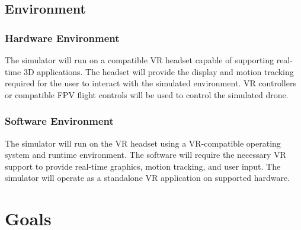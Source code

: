 \documentclass{article}
\begin{document}
\subsection{Environment}


\subsubsection{Hardware Environment}

The simulator will run on a compatible VR headset capable of supporting real-time 3D applications. The headset will provide the display and motion tracking required for the user to interact with the simulated environment. VR controllers or compatible FPV flight controls will be used to control the simulated drone.

\subsubsection{Software Environment}

The simulator will run on the VR headset using a VR-compatible operating system and runtime environment. The software will require the necessary VR support to provide real-time graphics, motion tracking, and user input. The simulator will operate as a standalone VR application on supported hardware.


\section{Goals}
\end{document}
